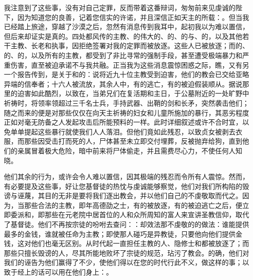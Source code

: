 \par

我注意到了这些事，没有对自己定罪，反而带着这番辩词，匆匆前来见虔诚的陛下，因为知道您的良善，记着您信实的许诺，并且深信正如天主的所载：。但当我已经踏上旅途，穿越了沙漠之后，忽然有消息传到我耳中，起初我以为难以置信，但后来却证实是真的。四处都风传的主教、的伟大的、的、的与、的，以及其他若干主教、长老和执事，因拒绝签署对我的定罪而被放逐。这些人已被放逐；而的、的、的，以及所有的主教，都受到了非比寻常的强制手段，甚至遭受极端暴力和严重伤害，直至被迫承诺不与我共融。正当我为这些消息震惊困惑之际，瞧，又有另一个报告传到，是关于和的：说将近九十位主教受到迫害，他们的教会已交给亚略异端的信奉者；十六人被流放，其余人中，有的逃亡，有的被迫假装顺从。据说那里的迫害如此酷烈，以致在，当弟兄们在复活期和主日，于公墓附近的一处旷野中祈祷时，将领率领超过三千名士兵，手持武器、出鞘的剑和长矛，突然袭击他们；随之而来的便是对那些仅仅在向天主祈祷的妇女和儿童所施加的暴行，其恶劣程度正如对毫无防备之人发起攻击后所能预料的一样。此时详细叙述或许不合时宜，以免单单提起这些暴行就使我们人人落泪。但他们竟如此残忍，以致贞女被剥去衣服，而那些因受击打而死的人，尸体甚至未立即交付埋葬，反被抛弃给狗，直到他们的亲属冒着极大危险，暗中前来将尸体偷走，并且需费尽心力，不使任何人知晓。\par

\par

他们其余的行为，或许会令人难以置信，因其极端的残忍而令所有人震惊。然而，有必要提及这些事，好让您基督徒的热忱与虔诚能够察觉，他们对我们所构陷的毁谤与诬蔑，其目的无非是要将我们逐出教会，并以他们自己的不虔敬取而代之。因为，当那些合法的主教，即年高德劭之士，有的被放逐，有的被迫逃亡之后，便立即委派和，即那些在元老院中居首位的人和众所周知的富人来宣讲圣教信仰，取代了基督徒。他们不再按宗徒的吩咐去查问：：却效法那不虔敬的的做法：谁能提供最多的金钱，谁就被任命为主教；即使那人碰巧是异教徒，只要他向他们提供金钱，这对他们也毫无区别。从时代起一直担任主教的人、隐修士和都被放逐了；而那些只擅长毁谤的人，尽其所能地败坏了宗徒的规范，玷污了教会。的确，他们对我们的诬告为他们赢得了不少，使他们得以在您的时代行此不义，做这样的事；以致于经上的话可以用在他们身上：。\par

